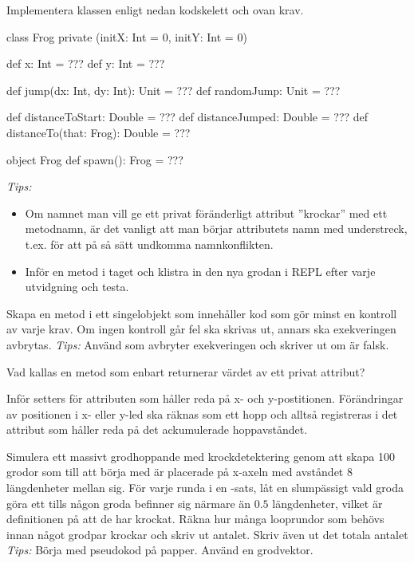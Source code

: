 \Subtask Implementera klassen  enligt nedan kodskelett och ovan krav.

\begin{Code}
class Frog private (initX: Int = 0, initY: Int = 0) {
  def x: Int = ???
  def y: Int = ???

  def jump(dx: Int, dy: Int): Unit = ???
  def randomJump: Unit = ???

  def distanceToStart: Double = ???
  def distanceJumped: Double = ???
  def distanceTo(that: Frog): Double = ???
}
object Frog {
  def spawn(): Frog = ???
}
\end{Code}
\emph{Tips:}
\begin{itemize} [nolistsep, noitemsep]
\item Om namnet man vill ge ett privat föränderligt attribut ''krockar'' med ett metodnamn, är det vanligt att man börjar attributets namn med understreck, t.ex.  för att på så sätt undkomma namnkonflikten.
\item Inför en metod i taget och klistra in den nya grodan i REPL efter varje utvidgning och testa.
\end{itemize}



\Subtask Skapa en metod  i ett singelobjekt  som innehåller kod som gör minst en kontroll av varje krav. Om ingen kontroll går fel ska  skrivas ut, annars ska exekveringen avbrytas. \emph{Tips:} Använd  som avbryter exekveringen och skriver ut  om  är falsk.

\Subtask Vad kallas en metod som enbart returnerar värdet av ett privat attribut?

\Subtask Inför setters för attributen som håller reda på x- och y-postitionen. Förändringar av positionen i x- eller y-led ska räknas som ett hopp och alltså registreras i det attribut som håller reda på det ackumulerade hoppavståndet.

\Subtask Simulera ett massivt grodhoppande med krockdetektering genom att skapa 100 grodor som till att börja med är placerade på x-axeln med avståndet $8$ längdenheter mellan sig. För varje runda i en -sats, låt en slumpässigt vald groda göra ett  tills någon groda befinner sig närmare än $0.5$ längdenheter, vilket är definitionen på att de har krockat. Räkna hur många looprundor som behövs innan något grodpar krockar och skriv ut antalet. Skriv även ut det totala antalet \\ \emph{Tips:} Börja med pseudokod på papper. Använd en grodvektor.


